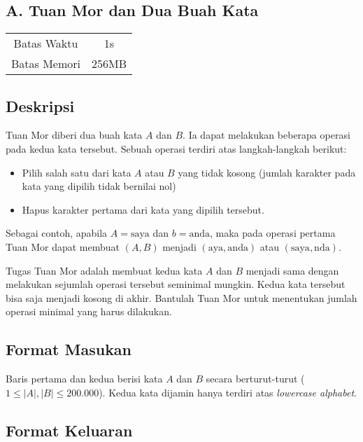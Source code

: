 \documentclass{article}
\begin{document}
\begin{center}
    \section*{A. Tuan Mor dan Dua Buah Kata}

    \begin{tabular}{ | c c | }
        \hline
        Batas Waktu  & 1s \\  
        Batas Memori & 256MB \\
        \hline
    \end{tabular}
\end{center}

\subsection*{Deskripsi}

Tuan Mor diberi dua buah kata $A$ dan $B$. Ia dapat melakukan beberapa operasi pada kedua kata tersebut. Sebuah operasi terdiri atas langkah-langkah berikut:

\begin{itemize}
    \setlength\itemsep{0pt}
    \item Pilih salah satu dari kata $A$ atau $B$ yang tidak kosong (jumlah karakter pada kata yang dipilih tidak bernilai nol)
    \item Hapus karakter pertama dari kata yang dipilih tersebut.
\end{itemize}

Sebagai contoh, apabila $A = \text{saya}$ dan $b = \text{anda}$, maka pada operasi pertama Tuan Mor dapat membuat $(A,B)$ menjadi $(\text{aya}, \text{anda})$ atau $(\text{saya}, \text{nda})$.

Tugas Tuan Mor adalah membuat kedua kata $A$ dan $B$ menjadi sama dengan melakukan sejumlah operasi tersebut seminimal mungkin. Kedua kata tersebut bisa saja menjadi kosong di akhir. Bantulah Tuan Mor untuk menentukan jumlah operasi minimal yang harus dilakukan.

\subsection*{Format Masukan}

Baris pertama dan kedua berisi kata $A$ dan $B$ secara berturut-turut ($1 \leq |A|, |B| \leq 200.000$). Kedua kata dijamin hanya terdiri atas \textit{lowercase alphabet}.  

\subsection*{Format Keluaran}
\end{document}
